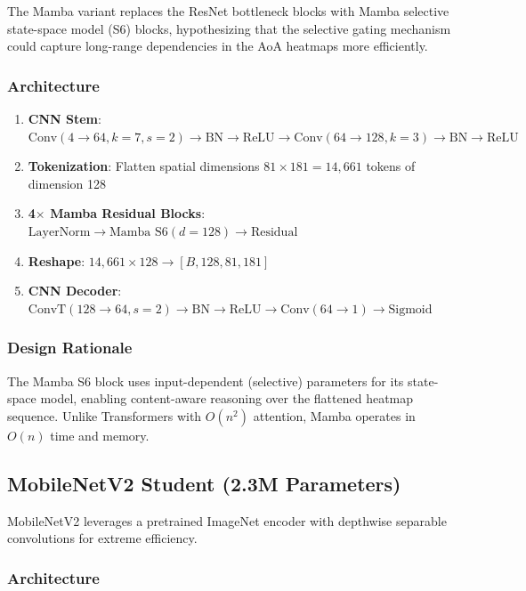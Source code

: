 \documentclass[11pt,a4paper]{article}
\begin{document}
The Mamba variant replaces the ResNet bottleneck blocks with Mamba selective state-space model (S6) blocks, hypothesizing that the selective gating mechanism could capture long-range dependencies in the AoA heatmaps more efficiently.

\subsubsection{Architecture}

\begin{enumerate}[leftmargin=*]
    \item \textbf{CNN Stem}: $\text{Conv}(4 \to 64, k{=}7, s{=}2) \to \text{BN} \to \text{ReLU} \to \text{Conv}(64 \to 128, k{=}3) \to \text{BN} \to \text{ReLU}$
    \item \textbf{Tokenization}: Flatten spatial dimensions $81\times181 = 14{,}661$ tokens of dimension 128
    \item \textbf{4$\times$ Mamba Residual Blocks}: $\text{LayerNorm} \to \text{Mamba S6}(d{=}128) \to \text{Residual}$
    \item \textbf{Reshape}: $14{,}661 \times 128 \to [B, 128, 81, 181]$
    \item \textbf{CNN Decoder}: $\text{ConvT}(128 \to 64, s{=}2) \to \text{BN} \to \text{ReLU} \to \text{Conv}(64 \to 1) \to \text{Sigmoid}$
\end{enumerate}

\subsubsection{Design Rationale}
The Mamba S6 block uses input-dependent (selective) parameters for its state-space model, enabling content-aware reasoning over the flattened heatmap sequence. Unlike Transformers with $O(n^2)$ attention, Mamba operates in $O(n)$ time and memory.

\subsection{MobileNetV2 Student (2.3M Parameters)}

MobileNetV2 leverages a pretrained ImageNet encoder with depthwise separable convolutions for extreme efficiency.

\subsubsection{Architecture}
\end{document}
